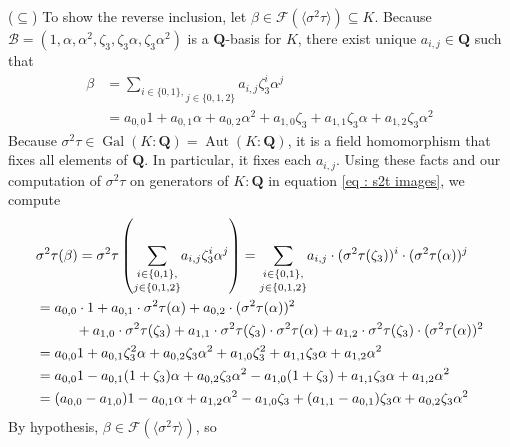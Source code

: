 \documentclass[oneside, english, 11pt]{article}
\newcommand{\fontField}[1]{\mathbf{#1}}
\newcommand{\Aut}{\automorphisms}
\DeclareMathOperator{\automorphisms}{Aut}
\newcommand{\fixedField}{\mathcal{F}}
\newcommand{\Gal}{\galoisGroup}
\DeclareMathOperator{\galoisGroup}{Gal}
\newcommand{\Q}{\rationals}
\newcommand{\rationals}{\fontField{Q}}
\begin{document}
($\subseteq$) To show the reverse inclusion, let $\beta \in \fixedField(\langle{}\sigma^{2} \tau\rangle{}) \subseteq K$. Because $\mathcal{B} = (1, \alpha, \alpha^{2}, \zeta_{3}, \zeta_{3} \alpha, \zeta_{3} \alpha^{2})$ is a $\Q$-basis for $K$, there exist unique $a_{i, j} \in \Q$ such that
\begin{align}
\beta
&=
\underset{j \in \{0, 1, 2\}}{\sum_{i \in \{0, 1\},}} a_{i, j} \zeta_{3}^{i} \alpha^{j}%
\nonumber
\\
&=
a_{0, 0} 1 + a_{0, 1} \alpha + a_{0, 2} \alpha^{2} + a_{1, 0} \zeta_{3} + a_{1, 1} \zeta_{3} \alpha + a_{1, 2} \zeta_{3} \alpha^{2}%
\label{eq : beta as linear combination}
\end{align}
Because $\sigma^{2} \tau \in \Gal(K : \Q) = \Aut(K : \Q)$, it is a field homomorphism that fixes all elements of $\Q$. In particular, it fixes each $a_{i, j}$. Using these facts and our computation of $\sigma^{2} \tau$ on generators of $K : \Q$ in equation \eqref{eq : s2t images}, we compute
\begin{align}
&\sigma^{2} \tau(\beta)
=
\sigma^{2} \tau\left(\underset{j \in \{0, 1, 2\}}{\sum_{i \in \{0, 1\},}} a_{i, j} \zeta_{3}^{i} \alpha^{j}\right)
=
\underset{j \in \{0, 1, 2\}}{\sum_{i \in \{0, 1\},}} a_{i, j} \cdot (\sigma^{2} \tau(\zeta_{3}))^{i} \cdot (\sigma^{2} \tau(\alpha))^{j}%
\nonumber
\\
&=
a_{0, 0} \cdot 1 + a_{0, 1} \cdot \sigma^{2} \tau(\alpha) + a_{0, 2} \cdot (\sigma^{2} \tau(\alpha))^{2}%
\nonumber
\\
&\hspace{10mm} + a_{1, 0} \cdot \sigma^{2} \tau(\zeta_{3}) + a_{1, 1} \cdot \sigma^{2} \tau(\zeta_{3}) \cdot \sigma^{2} \tau (\alpha) + a_{1, 2} \cdot \sigma^{2} \tau(\zeta_{3}) \cdot (\sigma^{2} \tau(\alpha))^{2}%
\nonumber
\\
&=
a_{0, 0} 1 + a_{0, 1} \zeta_{3}^{2} \alpha + a_{0, 2} \zeta_{3} \alpha^{2} + a_{1, 0} \zeta_{3}^{2} + a_{1, 1} \zeta_{3} \alpha + a_{1, 2} \alpha^{2}%
\nonumber
\\
&=
a_{0, 0} 1 - a_{0, 1} (1 + \zeta_{3}) \alpha + a_{0, 2} \zeta_{3} \alpha^{2} - a_{1, 0} (1 + \zeta_{3}) + a_{1, 1} \zeta_{3} \alpha + a_{1, 2} \alpha^{2}%
\nonumber
\\
&=
(a_{0, 0} - a_{1, 0}) 1 - a_{0, 1} \alpha + a_{1, 2} \alpha^{2} - a_{1, 0} \zeta_{3} + (a_{1, 1} - a_{0, 1}) \zeta_{3} \alpha + a_{0, 2} \zeta_{3} \alpha^{2}%
\label{eq : s2t beta as linear combination}
\end{align}
By hypothesis, $\beta \in \fixedField(\langle{}\sigma^{2} \tau\rangle{})$, so
\end{document}
